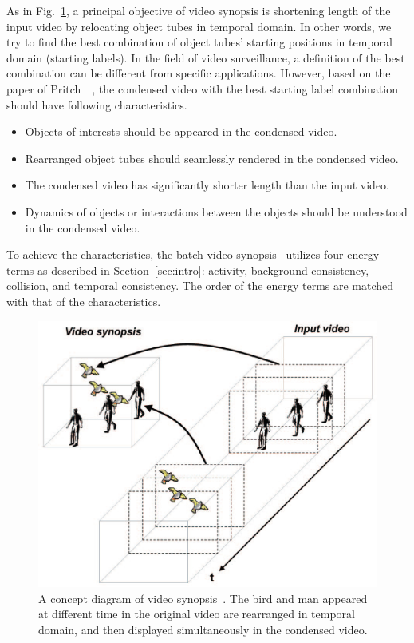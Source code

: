 \documentclass[11pt]{hyu_thesis}
\begin{document}
As in Fig.~\ref{fig:video_synopsis}, a principal objective of video synopsis is shortening length of the input video by relocating object tubes in temporal domain. In other words, we try to find the best combination of object tubes' starting positions in temporal domain (starting labels). In the field of video surveillance, a definition of the best combination can be different from specific applications. However, based on the paper of Pritch~\etal~\cite{Pritch2008}, the condensed video with the best starting label combination should have following characteristics.
\begin{itemize}
\item Objects of interests should be appeared in the condensed video.
\item Rearranged object tubes should seamlessly rendered in the condensed video.
\item The condensed video has significantly shorter length than the input video.
\item Dynamics of objects or interactions between the objects should be understood in the condensed video.
\end{itemize}
To achieve the characteristics, the batch video synopsis~\cite{Pritch2008} utilizes four energy terms as described in Section~\ref{sec:intro}: activity, background consistency, collision, and temporal consistency. The order of the energy terms are matched with that of the characteristics.

\begin{figure}
\begin{center}
\includegraphics[width=\linewidth]{video_synopsis.eps}
\end{center}
\caption{A concept diagram of video synopsis~\cite{Pritch2009}. The bird and man appeared at different time in the original video are rearranged in temporal domain, and then displayed simultaneously in the condensed video.}
\label{fig:video_synopsis}
\end{figure}
\end{document}
